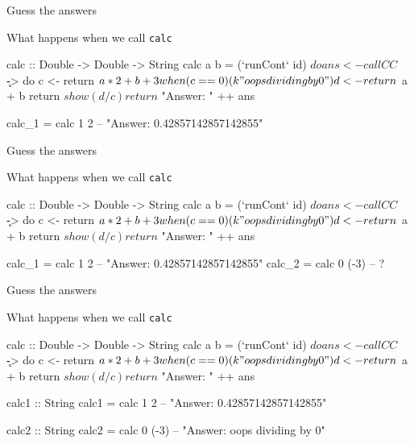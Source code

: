 \documentclass[ignorenonframetext,]{beamer}
\begin{document}
\begin{frame}[fragile]{Guess the answers}

What happens when we call \texttt{calc}

\begin{haskellcode}
calc :: Double -> Double -> String
calc a b = (`runCont` id) $ do

  ans <- callCC $ \k -> do
           c <- return $ a*2 + b + 3
           when (c == 0) (k "oops dividing by 0")
           d <- return $ a + b
           return $ show (d / c)

  return $ "Answer: " ++ ans
\end{haskellcode}

\begin{haskellcode}
calc_1 = calc 1 2    -- "Answer: 0.42857142857142855"
\end{haskellcode}

\end{frame}

\begin{frame}[fragile]{Guess the answers}

What happens when we call \texttt{calc}

\begin{haskellcode}
calc :: Double -> Double -> String
calc a b = (`runCont` id) $ do

  ans <- callCC $ \k -> do
           c <- return $ a*2 + b + 3
           when (c == 0) (k "oops dividing by 0")
           d <- return $ a + b
           return $ show (d / c)

  return $ "Answer: " ++ ans
\end{haskellcode}

\begin{haskellcode}
calc_1 = calc 1 2    -- "Answer: 0.42857142857142855"
calc_2 = calc 0 (-3) -- ?
\end{haskellcode}

\end{frame}

\begin{frame}[fragile]{Guess the answers}

What happens when we call \texttt{calc}

\begin{haskellcode}
calc :: Double -> Double -> String
calc a b = (`runCont` id) $ do

  ans <- callCC $ \k -> do
           c <- return $ a*2 + b + 3
           when (c == 0) (k "oops dividing by 0")
           d <- return $ a + b
           return $ show (d / c)

  return $ "Answer: " ++ ans
\end{haskellcode}

\begin{haskellcode}
calc1 :: String
calc1 = calc 1 2    -- "Answer: 0.42857142857142855"
\end{haskellcode}

\begin{haskellcode}
calc2 :: String
calc2 = calc 0 (-3) -- "Answer: oops dividing by 0"
\end{haskellcode}

\end{frame}
\end{document}
